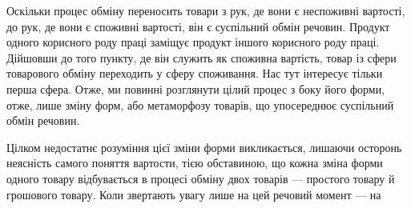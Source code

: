 Оскільки процес обміну переносить товари з рук, де вони є
неспоживні вартості, до рук, де вони є споживні вартості, він
є суспільний обмін речовин. Продукт одного корисного роду
праці заміщує продукт іншого корисного роду праці. Дійшовши
до того пункту, де він служить як споживна вартість, товар
із сфери товарового обміну переходить у сферу споживання.
Нас тут інтересує тільки перша сфера. Отже, ми повинні розглянути
цілий процес з боку його форми, отже, лише зміну форм,
або метаморфозу товарів, що упосереднює суспільний обмін
речовин.

Цілком недостатнє розуміння цієї зміни форми викликається,
лишаючи осторонь неясність самого поняття вартости, тією обставиною,
що кожна зміна форми одного товару відбувається в
процесі обміну двох товарів — простого товару й грошового
товару. Коли звертають увагу лише на цей речовий момент — на
\parbreak{}  %
